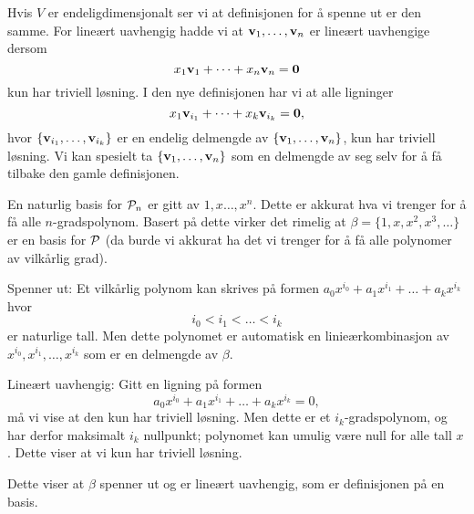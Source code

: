 \begin{losning}


\begin{punkt}
Hvis $V$ er endeligdimensjonalt ser vi at definisjonen for å spenne ut er den samme. For lineært uavhengig hadde vi at $\V{v}_1,\dots,\V{v}_n$ er lineært uavhengige dersom $$x_1\V{v}_1+\dots+x_n\V{v}_n=\V{0}$$ kun har triviell løsning. I den nye definisjonen har vi at alle ligninger $$x_1\V{v}_{i_1}+\dots+x_k\V{v}_{i_k}=\V{0},$$ hvor $\{\V{v}_{i_1},\dots,\V{v}_{i_k}\}$ er en endelig delmengde av $\{\V{v}_1,\dots,\V{v}_n\}$, kun har triviell løsning. Vi kan spesielt ta $\{\V{v}_1,\dots,\V{v}_n\}$ som en delmengde av seg selv for å få tilbake den gamle definisjonen.
\end{punkt}

\begin{punkt}
En naturlig basis for $\P_n$ er gitt av $1,x\dots,x^n$. Dette er akkurat hva vi trenger for å få alle $n$-gradspolynom. Basert på dette virker det rimelig at $\beta=\{1,x,x^2,x^3,\dots\}$ er en basis for $\P$ (da burde vi akkurat ha det vi trenger for å få alle polynomer av vilkårlig grad). 
\end{punkt}

\begin{punkt}
Spenner ut: Et vilkårlig polynom kan skrives på formen $a_0x^{i_0}+a_1x^{i_1}+\dots +a_kx^{i_k}$ hvor $$i_0<i_1<\dots<i_k$$ er naturlige tall. Men dette polynomet er automatisk en linieærkombinasjon av $x^{i_0},x^{i_1},\dots,x^{i_k}$ som er en delmengde av $\beta$.

\noindent
Lineært uavhengig: Gitt en ligning på formen $$a_0x^{i_0}+a_1x^{i_1}+\dots +a_kx^{i_k}=0,$$ må vi vise at den kun har triviell løsning. Men dette er et $i_k$-gradspolynom, og har derfor maksimalt $i_k$ nullpunkt; polynomet kan umulig være null for alle tall $x$. Dette viser at vi kun har triviell løsning.

\noindent
Dette viser at $\beta$ spenner ut og er lineært uavhengig, som er definisjonen på en basis.
\end{punkt}

\end{losning}







